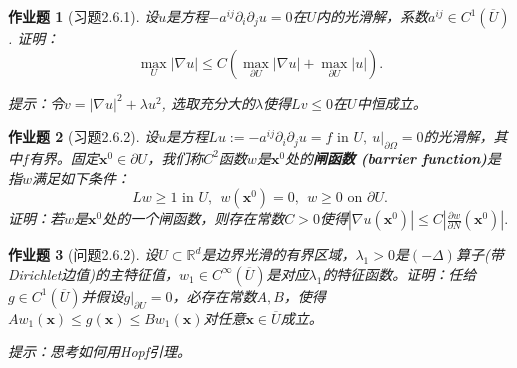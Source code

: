 \documentclass[UTF8,fontset=windows,12pt]{ctexart}
\theoremstyle{kaiti-theorem}
\newtheorem{problem}{作业题}
\numberwithin{equation}{section}
\newcommand{\R}{\mathbb{R}}
\newcommand{\bds}[1]{\boldsymbol{#1}}  %
\newcommand{\Om}{\Omega}
\newcommand{\ub}{{\overline{U}}}
\newcommand{\p}{\partial}
\newcommand{\lap}{\Delta}
\newcommand{\nab}{\nabla}
\newcommand{\lam}{\lambda}
\newcommand{\xx}{{\bds{x}}}
\begin{document}
\begin{problem}[习题2.6.1]
设$u$是方程$-a^{ij}\p_i\p_j u=0$在$U$内的光滑解，系数$a^{ij}\in C^1(\ub)$. 证明：
\[
\max_U|\nab u|\leqslant C(\max_{\p U}|\nab u|+\max_{\p U}|u|).
\]

提示：令$v=|\nab u|^2+\lam u^2$, 选取充分大的$\lam$使得$L v\leqslant 0$在$U$中恒成立。
\end{problem}

\begin{problem}[习题2.6.2]
设$u$是方程$Lu:=-a^{ij}\p_i\p_j u=f\text{ in }U,~ u|_{\p \Om}=0$的光滑解，其中$f$有界。固定$\xx^0\in\p U$，我们称$C^2$函数$w$是$\xx^0$处的\textbf{闸函数 (barrier function)}是指$w$满足如下条件：
\[
Lw\geqslant 1\text{ in }U,~~w(\xx^0)=0,~~w\geqslant 0\text{ on }\p U.
\]证明：若$w$是$\xx^0$处的一个闸函数，则存在常数$C>0$使得$|\nab u(\xx^0)|\leqslant C|\frac{\p w}{\p N}(\xx^0)|.$
\end{problem}


\begin{problem}[问题2.6.2]
设$U\subset\R^d$是边界光滑的有界区域，$\lam_1>0$是$(-\lap)$算子(带Dirichlet边值)的主特征值，$w_1\in C^\infty(\ub)$是对应$\lam_1$的特征函数。证明：任给$g\in C^1(\ub)$并假设$g|_{\p U}=0$，必存在常数$A, B$，使得$A w_1(\xx)\leqslant g(\xx) \leqslant B w_1(\xx)$对任意$\xx\in\ub$成立。

提示：思考如何用Hopf引理。
\end{problem}
\end{document}

